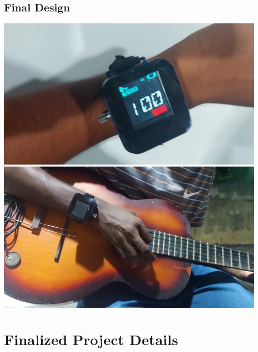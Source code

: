 \documentclass{article}
\begin{document}
        \subsection{Final Design}

        \begin{minipage}{\linewidth}
                \centering
                \includegraphics[height=0.25\linewidth]{6.jpeg}
                \hspace{0.005\linewidth}
                \includegraphics[height=0.25\linewidth]{7.jpeg}
                \captionsetup{justification=centering} %
            \end{minipage}

        \section{Finalized Project Details}
\end{document}
